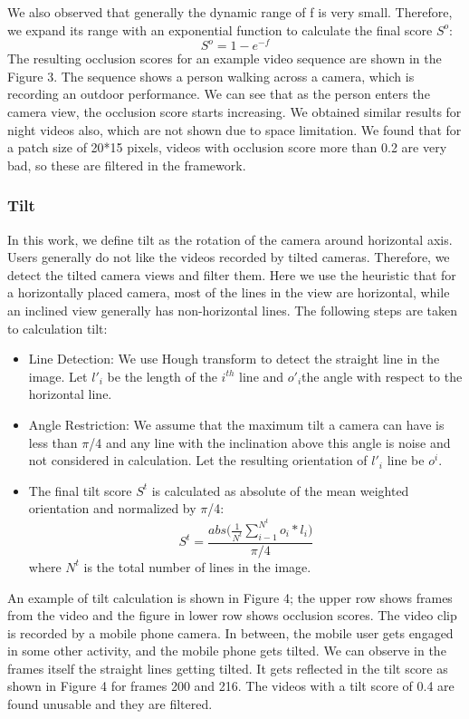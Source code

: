\documentclass{IEEEtran}
\begin{document}
We also observed that generally the dynamic range of f is very small. Therefore, we expand its range with an exponential function to calculate the final score $S^o$:
\[
  S^o = 1 - e^{-f}
\]
The resulting occlusion scores for an example video sequence are shown in the Figure 3. The sequence shows a person walking across a camera, which is recording an outdoor performance. We
can see that as the person enters the camera view, the occlusion score starts increasing. We obtained similar results for night videos also, which are not shown due to space limitation. We found that for a patch size of 20*15 pixels, videos with occlusion score more than 0.2 are very bad, so these are filtered in the framework.
\subsubsection{Tilt}
In this work, we define tilt as the rotation of the camera around horizontal axis. User\textquotesingle s generally do not like the videos recorded by tilted cameras. Therefore, we detect the tilted camera views and filter them. Here we use the heuristic that for a horizontally placed camera, most of the lines in the view are horizontal, while an inclined view generally has non-horizontal lines. The following steps are taken to calculation tilt:
\begin{itemize}
    \item Line Detection: We use Hough transform to detect the straight line in the image. Let ${l'}_i$ be the length of the $i^{th}$ line and ${o'}_i$the angle with respect to the horizontal line.
    \item Angle Restriction: We assume that the maximum tilt a camera can have is less than $\pi$/4 and any line with the inclination above this angle is noise and not considered in calculation. Let the resulting orientation of ${l'}_i$ line be ${o}^i$.
    \item The final tilt score $S^t$ is calculated as absolute of the mean weighted orientation and normalized by $\pi$/4:
    \[
      S^t = \frac{abs\big(\frac{1}{N^t}\sum_{i-1}^{N^t}o_i*l_i\big)}{\pi/4}
    \]
    where $N^t$ is the total number of lines in the image.
\end{itemize}
An example of tilt calculation is shown in Figure 4; the upper row shows frames from the video and the figure in lower row shows occlusion scores. The video clip is recorded by a mobile phone
camera. In between, the mobile user gets engaged in some other activity, and the mobile phone gets tilted. We can observe in the frames itself the straight lines getting tilted. It gets reflected in the tilt score as shown in Figure 4 for frames 200 and 216. The videos with a tilt score of 0.4 are found unusable and they are filtered.
\end{document}
